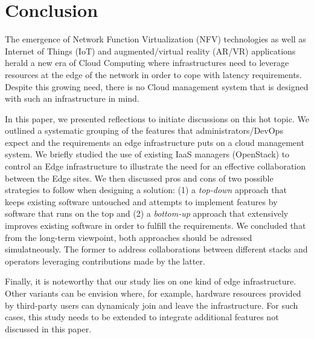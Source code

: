 
\section{Conclusion}
\label{sec:conclusion}

The emergence of Network Function Virtualization (NFV) technologies as
well as Internet of Things (IoT) and augmented/virtual reality (AR/VR)
applications herald a new era of Cloud Computing where infrastructures
need to leverage resources at the edge of the network in order to cope
with latency requirements.  Despite this growing need, there is no
Cloud management system that is designed with such an infrastructure
in mind.

In this paper, we presented reflections to initiate discussions on this
hot topic. We outlined a systematic grouping of the features that
administrators/DevOps expect and the requirements an edge
infrastructure puts on a cloud management system.
We briefly studied the use of existing IaaS managers (\ie OpenStack)
to control an Edge infrastructure to illustrate the need for an
effective collaboration between the Edge sites.  We then discussed
pros and cons of two possible strategies to follow when designing a
solution: (1) a \emph{top-down} approach that keeps existing software
untouched and attempts to implement features by software that runs on
the top and (2) a \emph{bottom-up} approach that extensively improves
existing software in order to fulfill the requirements. We concluded
that from the long-term viewpoint, both approaches should be adressed
simulatneously. The former to address collaborations between different stacks and operators leveraging contributions made by the latter.

Finally, it is noteworthy that our study lies on one kind of edge
infrastructure. Other variants can be envision where, for example,
hardware resources provided by third-party users can dynamicaly join
and leave the infrastructure. For such cases, this study needs to be
extended to integrate additional features not discussed in this paper.

